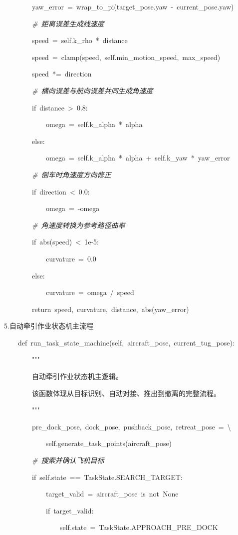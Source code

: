 ~~~~~~~~yaw\_error~=~wrap\_to\_pi(target\_pose.yaw~-~current\_pose.yaw)

~~~~~~~~\emph{\#~距离误差生成线速度}

~~~~~~~~speed~=~self.k\_rho~*~distance

~~~~~~~~speed~=~clamp(speed,~self.min\_motion\_speed,~max\_speed)

~~~~~~~~speed~*=~direction

~~~~~~~~\emph{\#~横向误差与航向误差共同生成角速度}

~~~~~~~~if~distance~\textgreater~0.8:

~~~~~~~~~~~~omega~=~self.k\_alpha~*~alpha

~~~~~~~~else:

~~~~~~~~~~~~omega~=~self.k\_alpha~*~alpha~+~self.k\_yaw~*~yaw\_error

~~~~~~~~\emph{\#~倒车时角速度方向修正}

~~~~~~~~if~direction~\textless~0.0:

~~~~~~~~~~~~omega~=~-omega

~~~~~~~~\emph{\#~角速度转换为参考路径曲率}

~~~~~~~~if~abs(speed)~\textless~1e-5:

~~~~~~~~~~~~curvature~=~0.0

~~~~~~~~else:

~~~~~~~~~~~~curvature~=~omega~/~speed

~~~~~~~~return~speed,~curvature,~distance,~abs(yaw\_error)

5.自动牵引作业状态机主流程

~~~~def~run\_task\_state\_machine(self,~aircraft\_pose,~current\_tug\_pose):

~~~~~~~~"""

~~~~~~~~自动牵引作业状态机主逻辑。

~~~~~~~~该函数体现从目标识别、自动对接、推出到撤离的完整流程。

~~~~~~~~"""

~~~~~~~~pre\_dock\_pose,~dock\_pose,~pushback\_pose,~retreat\_pose~=~\textbackslash{}

~~~~~~~~~~~~self.generate\_task\_points(aircraft\_pose)

~~~~~~~~\emph{\#~搜索并确认飞机目标}

~~~~~~~~if~self.state~==~TaskState.SEARCH\_TARGET:

~~~~~~~~~~~~target\_valid~=~aircraft\_pose~is~not~None

~~~~~~~~~~~~if~target\_valid:

~~~~~~~~~~~~~~~~self.state~=~TaskState.APPROACH\_PRE\_DOCK

